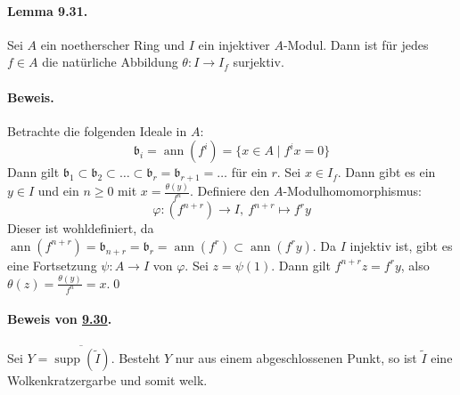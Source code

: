 \paragraph{Lemma 9.31.}\label{9.31} Sei $A$ ein noetherscher Ring und $I$ ein injektiver $A$-Modul. Dann ist für jedes $f\in A$ die natürliche Abbildung $\theta:I\to I_f$ surjektiv.

\paragraph{Beweis.} Betrachte die folgenden Ideale in $A$:
\[\mathfrak{b}_i=\operatorname{ann}(f^i)= \{x\in A\mid f^ix=0\} \]
Dann gilt $\mathfrak{b}_1\subset\mathfrak{b}_2\subset\ldots\subset\mathfrak{b}_r=\mathfrak{b}_{r+1}=\ldots$ für ein $r$. Sei $x\in I_f$. Dann gibt es ein $y\in I$ und ein $n\geq 0$ mit $x=\frac{\theta(y)}{f^n}$. Definiere den $A$-Modulhomomorphismus:
\[\varphi: (f^{n+r})\to I,\ f^{n+r}\mapsto f^ry \]
Dieser ist wohldefiniert, da $\operatorname{ann}(f^{n+r})= \mathfrak{b}_{n+r}=\mathfrak{b}_r = \operatorname{ann}(f^r)\subset\operatorname{ann}(f^ry)$. Da $I$ injektiv ist, gibt es eine Fortsetzung $\psi:A\to I$ von $\varphi$. Sei $z=\psi(1)$. Dann gilt $f^{n+r}z=f^ry$, also $\theta(z)=\frac{\theta(y)}{f^n}=x$.\qed

\paragraph{Beweis von \hyperref[9.30]{9.30}.} Sei $Y=\overline{\operatorname{supp}(\widetilde{I})}$. Besteht $Y$ nur aus einem abgeschlossenen Punkt, so ist $\widetilde{I}$ eine Wolkenkratzergarbe und somit welk.

